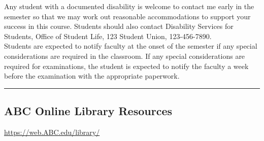 Any student with a documented disability is welcome to contact me early in the semester so that we may work out reasonable accommodations to support your success in this course. Students should also contact Disability Services for Students, Office of Student Life, 123 Student Union, 123-456-7890.\\


Students are expected to notify faculty at the onset of the semester if any special considerations are required in the classroom. If any special considerations are required for examinations, the student is expected to notify the faculty a week before the examination with the appropriate paperwork.

 \vspace{2ex}\hrule\vspace{2ex}



\subsection*{ABC Online Library Resources}
\url{https://web.ABC.edu/library/}


